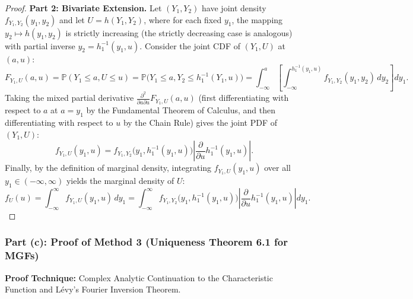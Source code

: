 \documentclass[11pt, letterpaper]{article}
\theoremstyle{definition}
\theoremstyle{remark}
\newcommand{\Prob}{\mathbb{P}}
\begin{document}
\begin{proof}
\textbf{Part 2: Bivariate Extension.} Let $(Y_1, Y_2)$ have joint density $f_{Y_1, Y_2}(y_1, y_2)$ and let $U = h(Y_1, Y_2)$, where for each fixed $y_1$, the mapping $y_2 \mapsto h(y_1, y_2)$ is strictly increasing (the strictly decreasing case is analogous) with partial inverse $y_2 = h_1^{-1}(y_1, u)$. Consider the joint CDF of $(Y_1, U)$ at $(a, u)$:
\[
    F_{Y_1, U}(a, u) = \Prob(Y_1 \le a, U \le u) = \Prob\big(Y_1 \le a, Y_2 \le h_1^{-1}(Y_1, u)\big) = \int_{-\infty}^a \left[ \int_{-\infty}^{h_1^{-1}(y_1, u)} f_{Y_1, Y_2}(y_1, y_2) \, dy_2 \right] dy_1.
\]
Taking the mixed partial derivative $\frac{\partial^2}{\partial a \partial u} F_{Y_1, U}(a, u)$ (first differentiating with respect to $a$ at $a = y_1$ by the Fundamental Theorem of Calculus, and then differentiating with respect to $u$ by the Chain Rule) gives the joint PDF of $(Y_1, U)$:
\[
    f_{Y_1, U}(y_1, u) = f_{Y_1, Y_2}\big(y_1, h_1^{-1}(y_1, u)\big) \left| \frac{\partial}{\partial u} h_1^{-1}(y_1, u) \right|.
\]
Finally, by the definition of marginal density, integrating $f_{Y_1, U}(y_1, u)$ over all $y_1 \in (-\infty, \infty)$ yields the marginal density of $U$:
\[
    f_U(u) = \int_{-\infty}^{\infty} f_{Y_1, U}(y_1, u) \, dy_1 = \int_{-\infty}^{\infty} f_{Y_1, Y_2}\big(y_1, h_1^{-1}(y_1, u)\big) \left| \frac{\partial}{\partial u} h_1^{-1}(y_1, u) \right| dy_1.
\]
\end{proof}

\subsubsection*{Part (c): Proof of Method 3 (Uniqueness Theorem 6.1 for MGFs)}
\textbf{Proof Technique:} Complex Analytic Continuation to the Characteristic Function and Lévy's Fourier Inversion Theorem.
\end{document}
